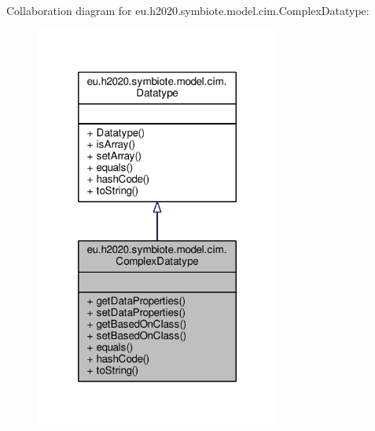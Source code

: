 Collaboration diagram for eu.\+h2020.\+symbiote.\+model.\+cim.\+Complex\+Datatype\+:
\nopagebreak
\begin{figure}[H]
\begin{center}
\leavevmode
\includegraphics[width=228pt]{classeu_1_1h2020_1_1symbiote_1_1model_1_1cim_1_1ComplexDatatype__coll__graph}
\end{center}
\end{figure}

